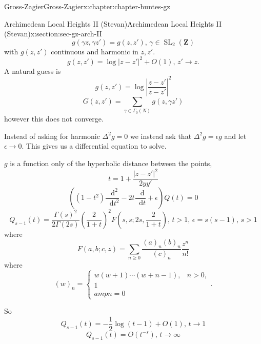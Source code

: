 \documentclass[oneside,10pt,]{book}
\numberwithin{equation}{section}
\newcommand{\diff}{\mathop{}\!\mathrm{d}}
\newcommand{\ZZ}{\mathbf{Z}}
\DeclareMathOperator{\SL}{SL}
\newcommand{\gt}{>}
\newcommand{\amp}{&}
\begin{document}
\begin{chapterptx}{Gross-Zagier}{}{Gross-Zagier}{}{}{x:chapter:chapter-buntes-gz}
\begin{sectionptx}{Archimedean Local Heights II (Stevan)}{}{Archimedean Local Heights II (Stevan)}{}{}{x:section:sec-gz-arch-II}
\begin{equation*}
g(\gamma z,\gamma z') = g(z,z'),\,\gamma \in \SL_2(\ZZ)
\end{equation*}
with \(g(z,z')\) continuous and harmonic in \(z,z'\).%
\begin{equation*}
g(z,z' ) = \log|z-z'|^2 + O(1),\,z'\to z\text{.}
\end{equation*}
A natural guess is%
\begin{equation*}
g(z,z') = \log \left | \frac{z-z'}{\bar z- z'}\right |^2
\end{equation*}
%
\begin{equation*}
G(z,z') = \sum_{\gamma \in \Gamma _0(N)} g(z,\gamma z')
\end{equation*}
however this does not converge.%
\par
Instead of asking for harmonic \(\Delta ^2 g = 0\) we instead ask that \(\Delta ^2 g = \epsilon  g\) and let \(\epsilon \to 0\). This gives us a differential equation to solve.%
\par
\(g\) is a function only of the hyperbolic distance between the points,%
\begin{equation*}
t = 1 + \frac{|z-z'|^2}{2yy'}
\end{equation*}
%
\begin{equation*}
((1-t^2) \frac{\diff^2}{\diff t^2} - 2t \frac{\diff}{\diff t} + \epsilon )Q(t) = 0
\end{equation*}
%
\begin{equation*}
Q_{s-1}(t) = \frac{\Gamma (s)^2}{2\Gamma (2s)} \left(\frac{2}{1+t}\right)^2 F(s,s; 2s, \frac{2}{1+t}),\,t\gt 1,\,\epsilon  = s(s-1),\,s\gt1
\end{equation*}
where%
\begin{equation*}
F(a,b; c, z)= \sum_{n\ge 0} \frac{(a)_n (b)_n}{(c)_n} \frac{z^n}{n!}
\end{equation*}
where%
\begin{equation*}
(w)_n = \begin{cases} w(w+1)\cdots(w+n-1),\amp n\gt 0,\\1\\amp n=0\end{cases}\text{.}
\end{equation*}
%
\par
So%
\begin{equation*}
Q_{s-1}(t) = -\frac12 \log(t-1)  + O(1),\,t \to 1
\end{equation*}
%
\begin{equation*}
Q_{s-1}(t) = O(t^{-s}),\,t \to \infty 
\end{equation*}

\end{sectionptx}
\end{chapterptx}
\end{document}
